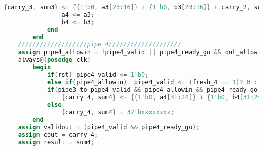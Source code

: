 \begin{lstlisting}[language=Verilog]
                {carry_3, sum3} <= {{1'b0, a3[23:16]} + {1'b0, b3[23:16]} + carry_2, sum2};
                a4 <= a3;
                b4 <= b3;
            end
        end
    ///////////////////pipe 4////////////////////
    assign pipe4_allowin = !pipe4_valid || pipe4_ready_go && out_allowin;
    always@(posedge clk)
        begin
            if(rst) pipe4_valid <= 1'b0;
            else if(pipe4_allowin)  pipe4_valid <= (fresh_4 == 1)? 0 : pipe3_to_pipe4_valid;
            if(pipe3_to_pipe4_valid && pipe4_allowin && pipe4_ready_go) 
                {carry_4, sum4} <= {{1'b0, a4[31:24]} + {1'b0, b4[31:24]} + carry_3, sum3};
            else
                {carry_4, sum4} = 32'hxxxxxxxx;
        end
    assign validout = (pipe4_valid && pipe4_ready_go);
    assign cout = carry_4;
    assign result = sum4;
\end{lstlisting}